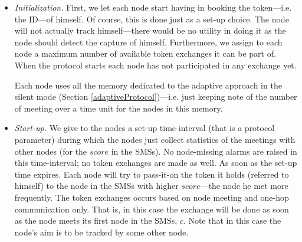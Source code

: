 \documentclass{IEEEconf}
\begin{document}
\begin{itemize}

\item \textit{Initialization.} First, we let each node start having in booking the token---i.e. the ID---of himself. Of course, this is done just as a set-up choice. The node will not actually track himself---there would be no utility in doing it as the node should detect the capture of himself. Furthermore, we assign to each node a maximum number of available token exchanges it can be part of. When the protocol starts each node has not participated in any exchange yet.

Each node uses all the memory dedicated to the adaptive approach in the silent mode (Section \ref{adaptiveProtocol})---i.e. just keeping note of the number of meeting over a time unit for the nodes in this memory.


\item \textit{Start-up.} We give to the nodes a set-up time-interval (that is a protocol parameter) during which the nodes just collect statistics of the meetings with other nodes (for the $score$ in the SMSs). No node-missing alarms are raised in this time-interval; no token exchanges are made as well.
As soon as the set-up time expires. Each node will try to pass-it-on the token it holds (referred to himself) to the node in the SMSs with higher $score$---the node he met more frequently. The token exchanges occurs based on node meeting and one-hop communication only. That is, in this case the exchange will be done as soon as the node meets its first node in the SMSs, $c$.
Note that in this case the node's aim is to be tracked by some other node.


\end{itemize}
\end{document}
